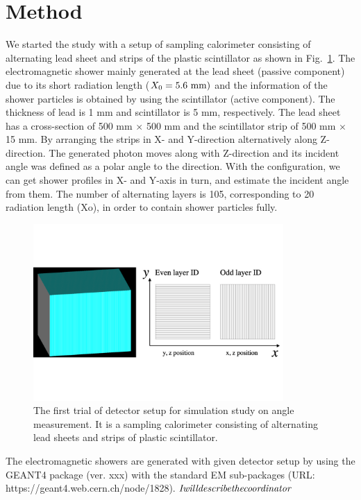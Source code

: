 \section{Method}
We started the study with a setup of sampling calorimeter consisting of alternating lead sheet and strips of the plastic scintillator as shown in Fig.~\ref{fig:det_conf}. The electromagnetic shower mainly generated at the lead sheet (passive component) due to its short radiation length ($X_0 = 5.6~{\rm mm})$ and the information of the shower particles is obtained by using the scintillator (active  component). The thickness of lead is 1 mm and scintillator is 5 mm, respectively. The lead sheet has a cross-section of  500 mm $\times$ 500 mm and the scintillator strip of 500 mm $\times$ 15 mm. By arranging the strips in X- and Y-direction alternatively along Z-direction. The generated photon moves along with Z-direction and its incident angle was defined as a polar angle to the direction.  With the configuration, we can get shower profiles in X- and Y-axis in turn, and estimate the incident angle from them. The number of alternating layers is 105, corresponding to 20 radiation length (Xo), in order to contain shower particles fully. 

\begin{figure}[!hbt]
\includegraphics[width=0.85\textwidth]{figures/Sec2/Prototype_samplingcal.pdf}

\caption{ The first trial of detector setup for simulation study on angle measurement. It is a sampling calorimeter consisting of alternating lead sheets and strips of plastic scintillator. }
\label{fig:det_conf}
\end{figure}

The electromagnetic showers are generated with given detector setup by using the GEANT4 package (ver. xxx) with the standard EM sub-packages (URL: https://geant4.web.cern.ch/node/1828). 
${\it I will describe the coordinator}$

